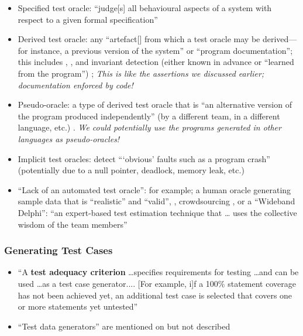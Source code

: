 \begin{itemize}
      \item Specified test oracle: ``judge[s] all behavioural aspects of a
            system with respect to a given formal specification''
            \citep[p.~510]{BarrEtAl2015}
      \item Derived test oracle: any ``artefact[] from which a
            test oracle may be derived---for instance, a previous version of
            the system'' or ``program documentation''; this includes
            ,
            \citep[p.~510]{BarrEtAl2015}, and invariant detection (either
            known in advance or ``learned from the program'')
            \citep[p.~516]{BarrEtAl2015}; \emph{This is like the assertions
                  we discussed earlier; documentation enforced by code!}
      \item Pseudo-oracle: a type of derived test oracle that is ``an
            alternative version of the program produced independently'' (by a
            different team, in a different language, etc.)
            \citep[p.~515]{BarrEtAl2015} .
            \emph{We could potentially use the
                  programs generated in other languages as pseudo-oracles!}
      \item Implicit test oracles: detect ```obvious' faults such as a program
            crash'' (potentially due to a null pointer, deadlock, memory leak,
            etc.) \citep[p.~510]{BarrEtAl2015}
      \item ``Lack of an automated test oracle'': for example; a human oracle
            generating sample data that is ``realistic'' and ``valid'',
            \citep[pp.~510-511]{BarrEtAl2015}, crowdsourcing
            \citep[p.~520]{BarrEtAl2015}, or a ``Wideband Delphi'': ``an
            expert-based test estimation technique that … uses the collective
            wisdom of the team members'' 
\end{itemize}

\subsubsection{Generating Test Cases}

\begin{itemize}
      \item ``A \textbf{test adequacy criterion} \dots specifies requirements
            for testing \dots and can be used \dots as a test case generator....
                  [For example, i]f a 100\% statement coverage has not been achieved
            yet, an additional test case is selected that covers one or more
            statements yet untested'' \citep[p.~402]{vanVliet2000}
      \item ``Test data generators'' are mentioned on
            \citep[p.~410]{vanVliet2000} but not described
\end{itemize}

